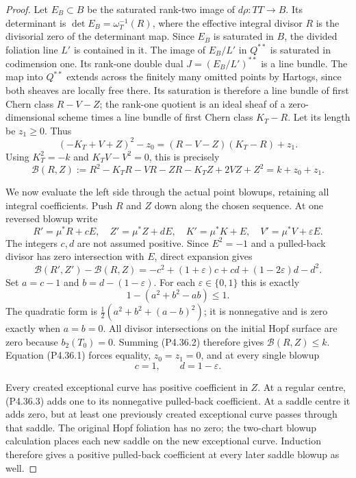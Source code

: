 \begin{proof}
Let $E_B\subset B$ be the saturated rank-two image
of $d\rho:TT\to B$. Its determinant is
$\det E_B=\omega_T^{-1}(R)$, where the effective
integral divisor $R$ is the divisorial zero of the
determinant map. Since $E_B$ is saturated in $B$,
the divided foliation line $L'$ is contained in it.
The image of $E_B/L'$ in $Q^{**}$ is saturated in
codimension one. Its rank-one double dual
$J=(E_B/L')^{**}$ is a line bundle. The map into
$Q^{**}$ extends across the finitely many omitted
points by Hartogs, since both sheaves are locally
free there. Its saturation is therefore a line bundle
of first Chern class $R-V-Z$; the rank-one quotient
is an ideal sheaf of a zero-dimensional scheme
times a line bundle of first Chern class $K_T-R$.
Let its length be $z_1\ge0$. Thus
\[
 (-K_T+V+Z)^2-z_0
       =(R-V-Z)(K_T-R)+z_1.
\]
Using $K_T^2=-k$ and $K_TV-V^2=0$, this is precisely
\[
 \mathcal B(R,Z)
 :=R^2-K_TR-VR-ZR-K_TZ+2VZ+Z^2
 =k+z_0+z_1.                                      \tag{P4.36.1}
\]

We now evaluate the left side through the actual
point blowups, retaining all integral coefficients.
Push $R$ and $Z$ down along the chosen sequence.
At one reversed blowup write
\[
 R'=\mu^*R+cE,\quad Z'=\mu^*Z+dE,
 \quad K'=\mu^*K+E,\quad V'=\mu^*V+\varepsilon E.
\]
The integers $c,d$ are not assumed positive.
Since $E^2=-1$ and a pulled-back divisor has zero
intersection with $E$, direct expansion gives
\[
 \mathcal B(R',Z')-\mathcal B(R,Z)
 =-c^2+(1+\varepsilon)c+cd+(1-2\varepsilon)d-d^2.
\]
Set $a=c-1$ and $b=d-(1-\varepsilon)$. For each
$\varepsilon\in\{0,1\}$ this is exactly
\[
 1-(a^2+b^2-ab)\le1.                            \tag{P4.36.2}
\]
The quadratic form is
$\frac12(a^2+b^2+(a-b)^2)$; it is nonnegative
and is zero exactly when $a=b=0$.
All divisor intersections on the initial Hopf
surface are zero because $b_2(T_0)=0$.
Summing (P4.36.2) therefore gives
$\mathcal B(R,Z)\le k$.
Equation (P4.36.1) forces equality, $z_0=z_1=0$,
and at every single blowup
\[
 c=1,\qquad d=1-\varepsilon.                    \tag{P4.36.3}
\]

Every created exceptional curve has positive
coefficient in $Z$. At a regular centre, (P4.36.3)
adds one to its nonnegative pulled-back coefficient.
At a saddle centre it adds zero, but at least one
previously created exceptional curve passes through
that saddle. The original Hopf foliation has no
zero; the two-chart blowup calculation places each
new saddle on the new exceptional curve. Induction
therefore gives a positive pulled-back coefficient
at every later saddle blowup as well.


\end{proof}
